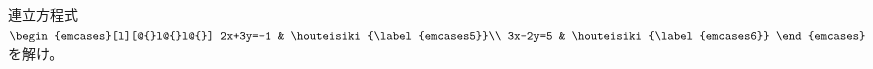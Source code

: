 連立方程式$\begin{emcases}[l][@{}l@{}l@{}]
2x+3y=-1 & \houteisiki{\label{emcases5}}\\
3x-2y=5 & \houteisiki{\label{emcases6}}
\end{emcases}$を解け。
